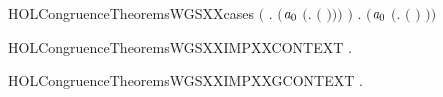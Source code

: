 \begin{SaveVerbatim}{HOLCongruenceTheoremsWGSXXcases}
       \ensuremath{(}\HOLSymConst{\HOLTokenExists{}} . \ensuremath{(}\ensuremath{\HOLBoundVar{a}\sb{\mathrm{0}}} \HOLSymConst{\ensuremath{=}} \ensuremath{(}\HOLTokenLambda{}.   \ensuremath{(} \ensuremath{)}\ensuremath{)}\ensuremath{)} \HOLSymConst{\HOLTokenConj{}}  \ensuremath{)} \HOLSymConst{\HOLTokenDisj{}}
       \HOLSymConst{\HOLTokenExists{}} . \ensuremath{(}\ensuremath{\HOLBoundVar{a}\sb{\mathrm{0}}} \HOLSymConst{\ensuremath{=}} \ensuremath{(}\HOLTokenLambda{}.  \ensuremath{(} \ensuremath{)} \ensuremath{)}\ensuremath{)} \HOLSymConst{\HOLTokenConj{}}  
\end{SaveVerbatim}
\newcommand{\HOLCongruenceTheoremsWGSXXcases}{\UseVerbatim{HOLCongruenceTheoremsWGSXXcases}}
\begin{SaveVerbatim}{HOLCongruenceTheoremsWGSXXIMPXXCONTEXT}
\HOLTokenTurnstile{} \HOLSymConst{\HOLTokenForall{}}.   \HOLSymConst{\HOLTokenImp{}}  
\end{SaveVerbatim}
\newcommand{\HOLCongruenceTheoremsWGSXXIMPXXCONTEXT}{\UseVerbatim{HOLCongruenceTheoremsWGSXXIMPXXCONTEXT}}
\begin{SaveVerbatim}{HOLCongruenceTheoremsWGSXXIMPXXGCONTEXT}
\HOLTokenTurnstile{} \HOLSymConst{\HOLTokenForall{}}.   \HOLSymConst{\HOLTokenImp{}}  
\end{SaveVerbatim}
\newcommand{\HOLCongruenceTheoremsWGSXXIMPXXGCONTEXT}{\UseVerbatim{HOLCongruenceTheoremsWGSXXIMPXXGCONTEXT}}
